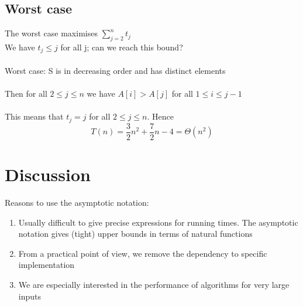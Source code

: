 \documentclass{article}[18pt]
\begin{document}
\subsection{Worst case}
The worst case maximises $\sum_{j=2}^{n}t_j$\\
We have $t_j\leqslant j$ for all j; can we reach this bound?\\
\\
Worst case: S is in decreasing order and has distinct elements\\
\\
Then for all $2\leqslant j \leqslant n$ we have $A[i] > A[j]$ for all $1\leqslant i \leqslant j-1$\\
\\
This means that $t_j=j$ for all $2\leqslant j \leqslant n$. Hence
\[
T(n)=\frac{3}{2} n^{2}+\frac{7}{2} n-4=\Theta\left(n^{2}\right)
\]
\section{Discussion}
Reasons to use the asymptotic notation:
\begin{enumerate}
	\item Usually difficult to give precise expressions for running times. The asymptotic notation gives (tight) upper bounds in terms of natural functions
	\item From a practical point of view, we remove the dependency to specific implementation
	\item We are especially interested in the performance of algorithms for very large inputs
\end{enumerate}
\end{document}
